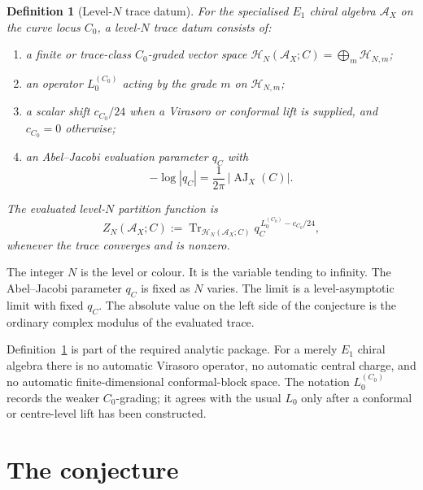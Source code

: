 \documentclass[11pt]{article}
\newtheorem{definition}[theorem]{Definition}
\newcommand{\cA}{\mathcal{A}}
\newcommand{\cH}{\mathcal{H}}
\newcommand{\AJ}{\operatorname{AJ}}
\newcommand{\Tr}{\operatorname{Tr}}
\begin{document}
\begin{definition}[Level-$N$ trace datum]
\label{def:trace-datum}
For the specialised $E_1$ chiral algebra $\cA_X$ on the curve locus
$C_0$, a level-$N$ trace datum consists of:
\begin{enumerate}[label=\textup{(T\arabic*)}]
\item a finite or trace-class $C_0$-graded vector space
  $\cH_N(\cA_X;C)=\bigoplus_m \cH_{N,m}$;
\item an operator $L_0^{(C_0)}$ acting by the grade $m$ on
  $\cH_{N,m}$;
\item a scalar shift $c_{C_0}/24$ when a Virasoro or conformal
  lift is supplied, and $c_{C_0}=0$ otherwise;
\item an Abel--Jacobi evaluation parameter $q_C$ with
  \[
    -\log |q_C|
    =
    \frac{1}{2\pi}\,|\AJ_X(C)|.
  \]
\end{enumerate}
The evaluated level-$N$ partition function is
\[
  Z_N(\cA_X;C)
  :=
  \Tr_{\cH_N(\cA_X;C)}
  q_C^{\,L_0^{(C_0)}-c_{C_0}/24},
\]
whenever the trace converges and is nonzero.
\end{definition}

The integer $N$ is the level or colour. It is the variable tending to
infinity. The Abel--Jacobi parameter $q_C$ is fixed as $N$ varies.
The limit is a level-asymptotic limit with fixed \(q_C\). The absolute
value on the left side of the conjecture is the ordinary complex modulus
of the evaluated trace.

Definition~\ref{def:trace-datum} is part of the required analytic
package. For a merely $E_1$ chiral algebra there is no automatic
Virasoro operator, no automatic central charge, and no automatic
finite-dimensional conformal-block space. The notation $L_0^{(C_0)}$
records the weaker $C_0$-grading; it agrees with the usual $L_0$ only
after a conformal or centre-level lift has been constructed.

\section{The conjecture}
\label{sec:conjecture}
\end{document}
